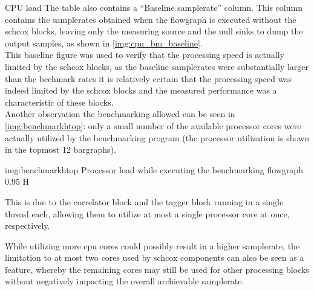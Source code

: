 \begin{subchapter}{CPU load}
  The table also contains a ``Baseline samplerate'' column.
  This column contains the samplerates obtained when the flowgraph
  is executed without the \gls{schcox} blocks, leaving only
  the measuring source and the null sinks to dump the
  output samples, as shown in \autoref{img:cpu_bm_baseline}. \\

  This baseline figure was used to verify that the
  processing speed is actually limited by the \gls{schcox} blocks,
  as the baseline samplerates were substantially larger
  than the bechmark rates it is relatively certain that
  the processing speed was indeed limited by the \gls{schcox} blocks
  and the measured performance was a characteristic of these blocks. \\

  Another observation the benchmarking allowed can be seen
  in \autoref{img:benchmarkhtop}: only a small number of the available
  processor cores were actually utilized by the benchmarking program
  (the processor utilization is shown in the topmost 12 bargraphs).

                  {img:benchmarkhtop}
                  {Processor load while executing the benchmarking flowgraph}
                  {0.95}
                  {H}

  This is due to the correlator block and the tagger block running
  in a single thread each, allowing them to utilize at most
  a single processor core at once, respectively.

  While utilizing more \gls{cpu} cores could possibly
  result in a higher samplerate, the limitation to at most
  two cores used by \gls{schcox} components can
  also be seen as a feature, whereby the remaining cores
  may still be used for other processing blocks without
  negatively impacting the overall archievable samplerate.
\end{subchapter}
